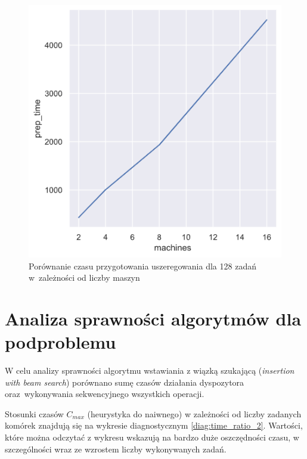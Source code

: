 \documentclass[brudnopis]{xmgr}
\begin{document}
\begin{figure}[!tbh]
\centering
\includegraphics[width=.8\hsize]{fig/relplot_16m.png}
\caption{Porównanie czasu przygotowania uszeregowania dla 128 zadań w~zależności od liczby maszyn\label{diag:relplot_16m}}
\end{figure}\medskip



\chapter{Analiza sprawności algorytmów dla podproblemu}

W celu analizy sprawności algorytmu wstawiania z wiązką szukającą (\emph{insertion with beam search}) porównano sumę czasów działania dyspozytora oraz~wykonywania sekwencyjnego wszystkich operacji.

Stosunki czasów $C_{max}$ (heurystyka do naiwnego) w zależności od liczby zadanych komórek znajdują się na wykresie diagnostycznym \ref{diag:time_ratio_2}. Wartości, które można odczytać z wykresu wskazują na bardzo duże oszczędności czasu, w szczególności wraz ze wzrostem liczby wykonywanych zadań.
\end{document}
